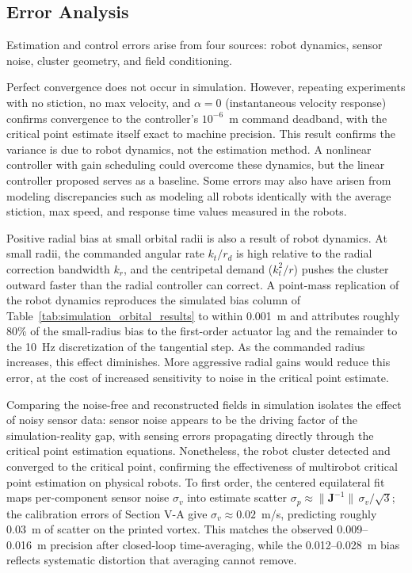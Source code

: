 \documentclass[lettersize,journal]{IEEEtran}
\begin{document}
\subsection{Error Analysis}

Estimation and control errors arise from four sources: robot dynamics, sensor noise, cluster geometry, and field conditioning.

Perfect convergence does not occur in simulation. However, repeating experiments with no stiction, no max velocity, and $\alpha = 0$ (instantaneous velocity response) confirms convergence to the controller's $10^{-6}$~m command deadband, with the critical point estimate itself exact to machine precision. This result confirms the variance is due to robot dynamics, not the estimation method. A nonlinear controller with gain scheduling could overcome these dynamics, but the linear controller proposed serves as a baseline. Some errors may also have arisen from modeling discrepancies such as modeling all robots identically with the average stiction, max speed, and response time values measured in the robots.

Positive radial bias at small orbital radii is also a result of robot dynamics. At small radii, the commanded angular rate $k_t / r_d$ is high relative to the radial correction bandwidth $k_r$, and the centripetal demand ($k_t^2 / r$) pushes the cluster outward faster than the radial controller can correct. A point-mass replication of the robot dynamics reproduces the simulated bias column of Table~\ref{tab:simulation_orbital_results} to within 0.001~m and attributes roughly 80\% of the small-radius bias to the first-order actuator lag and the remainder to the 10~Hz discretization of the tangential step. As the commanded radius increases, this effect diminishes. More aggressive radial gains would reduce this error, at the cost of increased sensitivity to noise in the critical point estimate.

Comparing the noise-free and reconstructed fields in simulation isolates the effect of noisy sensor data: sensor noise appears to be the driving factor of the simulation-reality gap, with sensing errors propagating directly through the critical point estimation equations. Nonetheless, the robot cluster detected and converged to the critical point, confirming the effectiveness of multirobot critical point estimation on physical robots. To first order, the centered equilateral fit maps per-component sensor noise $\sigma_v$ into estimate scatter $\sigma_p \approx \|\mathbf{J}^{-1}\|\,\sigma_v/\sqrt{3}$; the calibration errors of Section V-A give $\sigma_v \approx 0.02$~m/s, predicting roughly 0.03~m of scatter on the printed vortex. This matches the observed 0.009--0.016~m precision after closed-loop time-averaging, while the 0.012--0.028~m bias reflects systematic distortion that averaging cannot remove.
\end{document}
